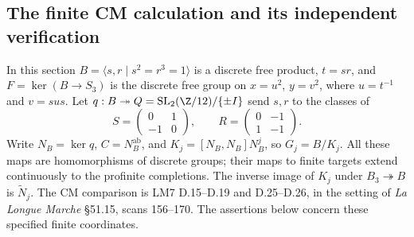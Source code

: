\subsection{The finite CM calculation and its independent verification}

In this section $B=\langle s,r\mid s^2=r^3=1\rangle$ is a discrete
free product, $t=sr$, and $F=\ker(B\to S_3)$ is the discrete free
group on $x=u^2$, $y=v^2$, where $u=t^{-1}$ and $v=sus$.
Let $q:B\twoheadrightarrow Q=\mathrm{SL}_2(\Z/12)/\{\pm I\}$
send $s,r$ to the classes of
\[
 S=\begin{pmatrix}0&1\\-1&0\end{pmatrix},\qquad
 R=\begin{pmatrix}0&-1\\1&-1\end{pmatrix}.
\]
Write $N_B=\ker q$, $C=N_B^{\mathrm{ab}}$, and
$K_j=[N_B,N_B]N_B^j$, so $G_j=B/K_j$. All these maps are homomorphisms
of discrete groups; their maps to finite targets extend continuously
to the profinite completions. The inverse image of $K_j$ under
$B_3\twoheadrightarrow B$ is $\widetilde N_j$.
The CM comparison is LM7 D.15--D.19 and D.25--D.26, in the setting
of \emph{La Longue Marche} \S51.15, scans 156--170. The assertions
below concern these specified finite coordinates.

